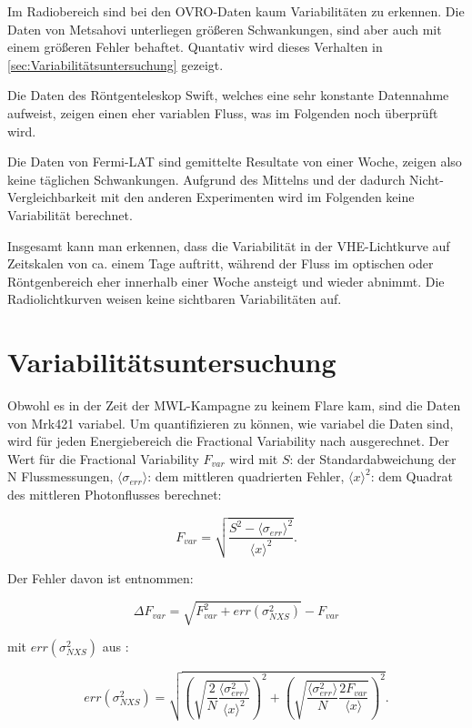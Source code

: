 Im Radiobereich sind bei den OVRO-Daten kaum Variabilitäten zu erkennen. 
Die Daten von Metsahovi unterliegen größeren Schwankungen, sind aber auch mit einem größeren Fehler behaftet.
Quantativ wird dieses Verhalten in \autoref{sec:Variabilitätsuntersuchung} gezeigt.

Die Daten des Röntgenteleskop Swift, welches eine sehr konstante Datennahme aufweist, zeigen einen eher variablen Fluss, was im Folgenden noch überprüft wird.

Die Daten von Fermi-LAT sind gemittelte Resultate von einer Woche, zeigen also keine täglichen Schwankungen.
Aufgrund des Mittelns und der dadurch Nicht-Vergleichbarkeit mit den anderen Experimenten wird im Folgenden keine Variabilität berechnet.

Insgesamt kann man erkennen, dass die Variabilität in der VHE-Lichtkurve auf Zeitskalen von ca. einem Tage auftritt, während der Fluss im optischen oder Röntgenbereich eher innerhalb einer Woche ansteigt und wieder abnimmt. 
Die Radiolichtkurven weisen keine sichtbaren Variabilitäten auf.

\section{Variabilitätsuntersuchung}
\label{sec:Variabilitätsuntersuchung}
Obwohl es in der Zeit der MWL-Kampagne zu keinem Flare kam, sind die Daten von Mrk421 variabel.
Um quantifizieren zu können, wie variabel die Daten sind, wird für jeden Energiebereich die Fractional Variability nach \cite{Vaughan} ausgerechnet.
Der Wert für die Fractional Variability $F_{var}$ wird mit $S$: der Standardabweichung der N Flussmessungen, $\langle \sigma_{err} \rangle$: dem mittleren quadrierten Fehler, $\langle x \rangle^2$: dem Quadrat des mittleren Photonflusses berechnet:

\begin{equation}
 F_{var}=\sqrt{\frac{S^2-\langle \sigma_{err} \rangle^2}{\langle x \rangle^2}}.
\end{equation}

Der Fehler davon ist \cite{FehlerVariability} entnommen: 

\begin{equation}
 \Delta F_{var}=\sqrt{F_{var}^2+err(\sigma_{NXS}^2)}-F_{var}
\end{equation}

mit $err(\sigma_{NXS}^2)$ aus \cite{Vaughan}:

\begin{equation}
 err(\sigma_{NXS}^2)=\sqrt{\left(\sqrt{\frac{2}{N} \frac{\langle \sigma_{err}^2 \rangle}{\langle x \rangle^2}} \right)^2 + \left( \sqrt{\frac{\langle\sigma_{err}^2 \rangle}{N} \frac{2F_{var}}{\langle x \rangle}} \right)^2}.
\end{equation}

